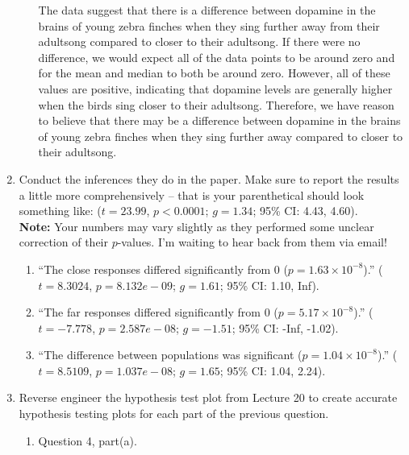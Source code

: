 \documentclass{article}\usepackage[]{graphicx}\usepackage[]{xcolor}
\newenvironment{knitrout}{}{} %
\begin{document}
\begin{enumerate}
\begin{enumerate}
The data suggest that there is a difference between dopamine in the brains of young zebra finches when they sing further away from their adultsong compared to closer to their adultsong. If there were no difference, we would expect all of the data points to be around zero and for the mean and median to both be around zero. However, all of these values are positive, indicating that dopamine levels are generally higher when the birds sing closer to their adultsong. Therefore, we have reason to believe that there may be a difference between dopamine in the brains of young zebra finches when they sing further away compared to closer to their adultsong.
\end{enumerate}
\item Conduct the inferences they do in the paper. Make sure to report the results
a little more comprehensively -- that is your parenthetical should look something
like: ($t=23.99$, $p<0.0001$; $g=1.34$; 95\% CI: 4.43, 4.60).\\
\textbf{Note:} Your numbers may vary slightly as they performed some unclear
correction of their $p$-values. I'm waiting to hear back from them via email!
\begin{enumerate}
  \item ``The close responses differed significantly from 0 ($p=1.63 \times 10^{-8}$).''
\newline ($t=8.3024$, $p=8.132e-09$; $g=1.61$; 95\% CI: 1.10, Inf).
  \item ``The far responses differed significantly from 0 ($p=5.17 \times 10^{-8}$).''
\newline ($t=-7.778$, $p=2.587e-08$; $g=-1.51$; 95\% CI: -Inf, -1.02).
  \item ``The difference between populations was significant ($p=1.04 \times10^{-8}$).''
\newline ($t=8.5109$, $p=1.037e-08$; $g=1.65$; 95\% CI: 1.04, 2.24).
\end{enumerate}
\newpage
\item Reverse engineer the hypothesis test plot from Lecture 20 to create accurate
hypothesis testing plots for each part of the previous question.
\begin{enumerate}
  \item Question 4, part(a).
\begin{knitrout}
\color{fgcolor}


\end{knitrout}
\end{enumerate}
\end{enumerate}
\end{document}

